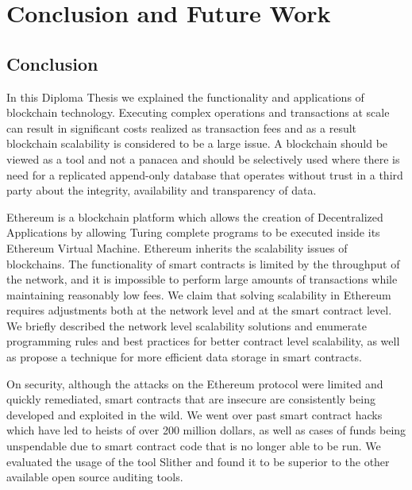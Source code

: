 \chapter{Conclusion and Future Work}\label{ch:conclusion}

\section{Conclusion}
In this Diploma Thesis we explained the functionality and applications of blockchain technology. Executing complex operations and transactions at scale can result in significant costs realized as transaction fees and as a result blockchain scalability is considered to be a large issue. A blockchain should be viewed as a tool and not a panacea and should be selectively used where there is need for a replicated append-only database that operates without trust in a third party about the integrity, availability and transparency of data. 

Ethereum is a blockchain platform which allows the creation of Decentralized Applications by allowing Turing complete programs to be executed inside its Ethereum Virtual Machine. Ethereum inherits the scalability issues of blockchains. The functionality of smart contracts is limited by the throughput of the network, and it is impossible to perform large amounts of transactions while maintaining reasonably low fees. We claim that solving scalability in Ethereum requires adjustments both at the network level and at the smart contract level. We briefly described the network level scalability solutions and enumerate programming rules and best practices for better contract level scalability, as well as propose a technique for more efficient data storage in smart contracts.

On security, although the attacks on the Ethereum protocol were limited and quickly remediated, smart contracts that are insecure are consistently being developed and exploited in the wild. We went over past smart contract hacks which have led to heists of over 200 million dollars, as well as cases of funds being unspendable due to smart contract code that is no longer able to be run. We evaluated the usage of the tool Slither and found it to be superior to the other available open source auditing tools. 

